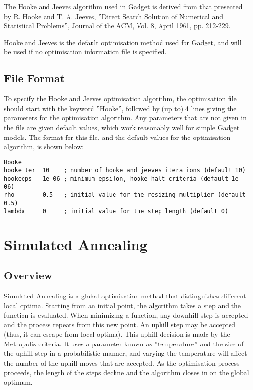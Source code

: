 \documentclass [a4paper, 10pt]{book}
\begin{document}
\bigskip
The Hooke and Jeeves algorithm used in Gadget is derived from that presented by R. Hooke and T. A. Jeeves, ''Direct Search Solution of Numerical and Statistical Problems'', Journal of the ACM, Vol. 8, April 1961, pp. 212-229.

\bigskip
Hooke and Jeeves is the default optimisation method used for Gadget, and will be used if no optimisation information file is specified.

\subsection{File Format}
To specify the Hooke and Jeeves optimisation algorithm, the optimisation file should start with the keyword ''Hooke'', followed by (up to) 4 lines giving the parameters for the optimisation algorithm.  Any parameters that are not given in the file are given default values, which work reasonably well for simple Gadget models.  The format for this file, and the default values for the optimisation algorithm, is shown below:

\begin{verbatim}
Hooke
hookeiter  10    ; number of hooke and jeeves iterations (default 10)
hookeeps   1e-06 ; minimum epsilon, hooke halt criteria (default 1e-06)
rho        0.5   ; initial value for the resizing multiplier (default 0.5)
lambda     0     ; initial value for the step length (default 0)
\end{verbatim}

\section{Simulated Annealing}\label{sec:simann}
\subsection{Overview}
Simulated Annealing is a global optimisation method that distinguishes different local optima.  Starting from an initial point, the algorithm takes a step and the function is evaluated.  When minimizing a function, any downhill step is accepted and the process repeats from this new point.  An uphill step may be accepted (thus, it can escape from local optima).  This uphill decision is made by the Metropolis criteria.  It uses a parameter known as ''temperature'' and the size of the uphill step in a probabilistic manner, and varying the temperature will affect the number of the uphill moves that are accepted.  As the optimisation process proceeds, the length of the steps decline and the algorithm closes in on the global optimum.
\end{document}
